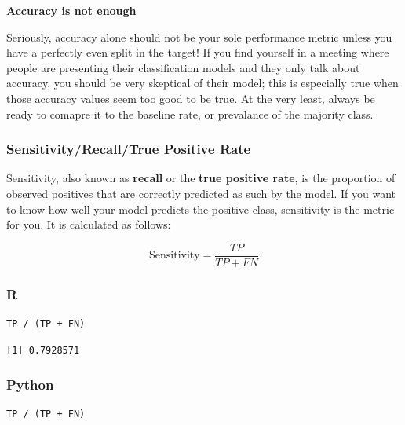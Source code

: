 \documentclass[
  letterpaper,
]{krantz}
\begin{document}
\begin{tcolorbox}[enhanced jigsaw, opacityback=0, leftrule=.75mm, bottomrule=.15mm, colframe=quarto-callout-warning-color-frame, rightrule=.15mm, breakable, left=2mm, colback=white, arc=.35mm, toprule=.15mm]

\vspace{-3mm}\textbf{Accuracy is not enough}\vspace{3mm}

Seriously, accuracy alone should not be your sole performance metric
unless you have a perfectly even split in the target! If you find
yourself in a meeting where people are presenting their classification
models and they only talk about accuracy, you should be very skeptical
of their model; this is especially true when those accuracy values seem
too good to be true. At the very least, always be ready to comapre it to
the baseline rate, or prevalance of the majority class.

\end{tcolorbox}

\subsubsection{Sensitivity/Recall/True Positive
Rate}\label{sec-knowing-metrics-sensitivity}

Sensitivity, also known as \textbf{recall} or the \textbf{true positive
rate}, is the proportion of observed positives that are correctly
predicted as such by the model. If you want to know how well your model
predicts the positive class, sensitivity is the metric for you. It is
calculated as follows:

\[\text{Sensitivity} = \frac{TP}{TP + FN}\]

\subsubsection{R}

\begin{verbatim}
TP / (TP + FN)
\end{verbatim}

\begin{verbatim}
[1] 0.7928571
\end{verbatim}

\subsubsection{Python}

\begin{verbatim}
TP / (TP + FN)
\end{verbatim}
\end{document}
